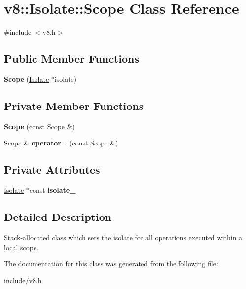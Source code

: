 \hypertarget{classv8_1_1_isolate_1_1_scope}{}\section{v8\+:\+:Isolate\+:\+:Scope Class Reference}
\label{classv8_1_1_isolate_1_1_scope}


{\ttfamily \#include $<$v8.\+h$>$}

\subsection*{Public Member Functions}
\begin{DoxyCompactItemize}
\item 
{\bfseries Scope} (\hyperlink{classv8_1_1_isolate}{Isolate} $\ast$isolate)\hypertarget{classv8_1_1_isolate_1_1_scope_a43889336478a5625e095c4444b9dd684}{}\label{classv8_1_1_isolate_1_1_scope_a43889336478a5625e095c4444b9dd684}

\end{DoxyCompactItemize}
\subsection*{Private Member Functions}
\begin{DoxyCompactItemize}
\item 
{\bfseries Scope} (const \hyperlink{classv8_1_1_isolate_1_1_scope}{Scope} \&)\hypertarget{classv8_1_1_isolate_1_1_scope_aeda42aa2368c6457501d93b6b49f7a59}{}\label{classv8_1_1_isolate_1_1_scope_aeda42aa2368c6457501d93b6b49f7a59}

\item 
\hyperlink{classv8_1_1_isolate_1_1_scope}{Scope} \& {\bfseries operator=} (const \hyperlink{classv8_1_1_isolate_1_1_scope}{Scope} \&)\hypertarget{classv8_1_1_isolate_1_1_scope_a26e6037afc853030761aebcf50aa528c}{}\label{classv8_1_1_isolate_1_1_scope_a26e6037afc853030761aebcf50aa528c}

\end{DoxyCompactItemize}
\subsection*{Private Attributes}
\begin{DoxyCompactItemize}
\item 
\hyperlink{classv8_1_1_isolate}{Isolate} $\ast$const {\bfseries isolate\+\_\+}\hypertarget{classv8_1_1_isolate_1_1_scope_ae7c3d914392a3e2bf2721229a19d97a3}{}\label{classv8_1_1_isolate_1_1_scope_ae7c3d914392a3e2bf2721229a19d97a3}

\end{DoxyCompactItemize}


\subsection{Detailed Description}
Stack-\/allocated class which sets the isolate for all operations executed within a local scope. 

The documentation for this class was generated from the following file\+:\begin{DoxyCompactItemize}
\item 
include/v8.\+h\end{DoxyCompactItemize}
